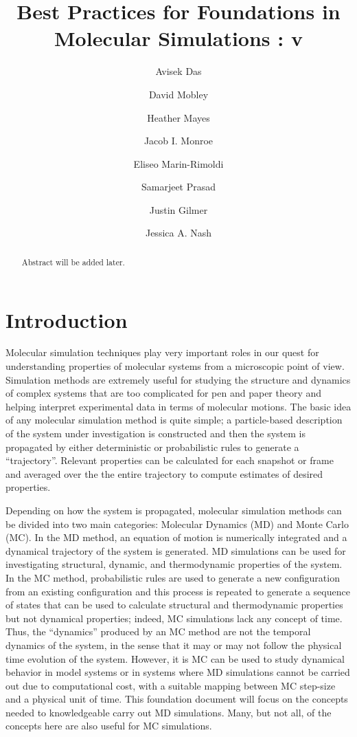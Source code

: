 \documentclass[9pt,bestpractices]{livecoms}
\title{Best Practices for Foundations in Molecular Simulations : v\versionnumber}
\author[1*]{Avisek Das}
\author[2]{David Mobley}
\author[1]{Heather Mayes}
\author[3]{Jacob I. Monroe}
\author[4]{Eliseo Marin-Rimoldi}
\author[5]{Samarjeet Prasad}
\author[6]{Justin Gilmer}
\author[7]{Jessica A. Nash}
\affil[1]{University of Michigan}
\affil[2]{University of California, Irvine}
\affil[3]{University of California, Santa Barbara}
\affil[4]{Univ 4}
\affil[5]{National Institutes of Standard and Technology}
\affil[6]{Univ 5}
\affil[7]{Univ 6}
\begin{document}
\maketitle

\begin{abstract}
Abstract will be added later.
\end{abstract}


\section{Introduction}

Molecular simulation techniques play very important roles in our quest for understanding properties of molecular systems from a microscopic point of view. Simulation methods are extremely useful for studying the structure and dynamics of complex systems that are too complicated for pen and paper theory and helping interpret experimental data in terms of molecular motions. The basic idea of any molecular simulation method is quite simple; a particle-based description of the system under investigation is constructed and then the system is propagated by either deterministic or probabilistic rules to generate a “trajectory”. Relevant properties can be calculated for each snapshot or frame and averaged over the the entire trajectory to compute estimates of desired properties. 

Depending on how the system is propagated, molecular simulation methods can be divided into two main categories: Molecular Dynamics (MD) and Monte Carlo (MC). In the MD method, an equation of motion is numerically integrated and a dynamical trajectory of the system is generated. MD simulations can be used for investigating structural, dynamic, and thermodynamic properties of the system. In the MC method, probabilistic rules are used to generate a new configuration from an existing configuration and this process is repeated to generate a sequence of states that can be used to calculate structural and thermodynamic properties but not dynamical properties; indeed, MC simulations lack any concept of time. Thus, the “dynamics” produced by an MC method are not the temporal dynamics of the system, in the sense that it may or may not follow the physical time evolution of the system. However, it is MC can be used  to study dynamical behavior in model systems or in systems where MD simulations cannot be carried out due to computational cost, with a suitable mapping between MC step-size and a physical unit of time. This foundation document will focus on the concepts needed to knowledgeable carry out MD simulations. Many, but not all, of the concepts here are also useful for MC simulations. 
\end{document}
